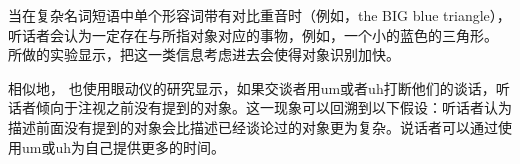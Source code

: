 
当在复杂名词短语中单个形容词带有对比重音时（例如，the BIG blue triangle），听话者会认为一定存在与所指对象对应的事物，例如，一个小的蓝色的三角形。 \citet{TSKES96a}所做的实验显示，把这一类信息考虑进去会使得对象识别加快。

相似地， \citet{ATAF2004a}也使用眼动仪的研究显示，如果交谈者用um或者uh打断他们的谈话，听话者倾向于注视之前没有提到的对象。这一现象可以回溯到以下假设：听话者认为描述前面没有提到的对象会比描述已经谈论过的对象更为复杂。说话者可以通过使用um或uh为自己提供更多的时间。

